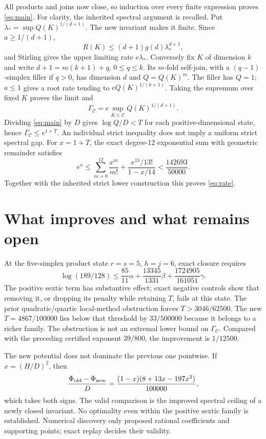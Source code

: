 \documentclass[11pt]{article}
\newcommand{\CC}{\mathcal C}
\begin{document}
All products and joins now close, so induction over every finite expression proves \eqref{eq:main}. For clarity, the inherited spectral argument \cite{spectral} is recalled. Put $\lambda_* =\sup Q(K)^{1/(d+1)}$. The new invariant makes it finite. Since $a\ge1/(d+1)$,
\[
 R(K)\le(d+1)g(d)\lambda_*^{d+1},
\]
and Stirling gives the upper limiting rate $e\lambda_*$. Conversely fix $K$ of dimension $k$ and write $d+1=m(k+1)+q$, $0\le q\le k$. Its $m$-fold self-join, with a $(q-1)$-simplex filler if $q>0$, has dimension $d$ and $Q=Q(K)^m$. The filler has $Q=1$; $a\le1$ gives a root rate tending to $eQ(K)^{1/(k+1)}$. Taking the supremum over fixed $K$ proves the limit and
\[
 \Gamma_{\CC}=e\sup_{K\in\CC}Q(K)^{1/(d+1)}.
\]
Dividing \eqref{eq:main} by $D$ gives $\log Q/D<T$ for each positive-dimensional state, hence $\Gamma_{\CC}\le e^{1+T}$. An individual strict inequality does not imply a uniform strict spectral gap. For $x=1+T$, the exact degree-12 exponential sum with geometric remainder satisfies
\[
 e^x\le\sum_{m=0}^{12}\frac{x^m}{m!}
       +\frac{x^{13}/13!}{1-x/14}<\frac{142693}{50000}.
\]
Together with the inherited strict lower construction this proves \eqref{eq:rate}.

\section{What improves and what remains open}
At the five-simplex product state $r=s=5$, $h=j=6$, exact closure requires
\[
 \log(189/128)\le\frac{85}{11}\alpha+\frac{13345}{1331}\beta
                    +\frac{1724905}{161051}\gamma.
\]
The positive sextic term has substantive effect; exact negative controls show that removing it, or dropping its penalty while retaining $T$, fails at this state. The prior quadratic/quartic local-method obstruction forces $T>3046/62500$. The new $T=4867/100000$ lies below that threshold by $33/500000$ because it belongs to a richer family. The obstruction is not an extremal lower bound on $\Gamma_{\CC}$. Compared with the preceding certified exponent $39/800$, the improvement is $1/12500$.

The new potential does not dominate the previous one pointwise. If $x=(H/D)^2$, then
\[
 \frac{\Phi_{\rm old}-\Phi_{\rm new}}D
  =\frac{(1-x)(8+13x-197x^2)}{100000},
\]
which takes both signs. The valid comparison is the improved spectral ceiling of a newly closed invariant. No optimality even within the positive sextic family is established. Numerical discovery only proposed rational coefficients and supporting points; exact replay decides their validity.
\end{document}

